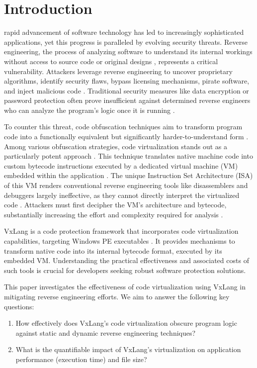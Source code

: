 \section{Introduction}
 rapid advancement of software technology has led to increasingly sophisticated applications, yet this progress is paralleled by evolving security threats. Reverse engineering, the process of analyzing software to understand its internal workings without access to source code or original designs \cite{Has18}, represents a critical vulnerability. Attackers leverage reverse engineering to uncover proprietary algorithms, identify security flaws, bypass licensing mechanisms, pirate software, and inject malicious code \cite{Wak24}. Traditional security measures like data encryption or password protection often prove insufficient against determined reverse engineers who can analyze the program's logic once it is running \cite{Sec19}.

To counter this threat, code obfuscation techniques aim to transform program code into a functionally equivalent but significantly harder-to-understand form \cite{Jin24}. Among various obfuscation strategies, code virtualization stands out as a particularly potent approach \cite{Ore06, Zho24}. This technique translates native machine code into custom bytecode instructions executed by a dedicated virtual machine (VM) embedded within the application \cite{Don20}. The unique Instruction Set Architecture (ISA) of this VM renders conventional reverse engineering tools like disassemblers and debuggers largely ineffective, as they cannot directly interpret the virtualized code \cite{Salwan2018SymbolicDeobfuscation}. Attackers must first decipher the VM's architecture and bytecode, substantially increasing the effort and complexity required for analysis \cite{Hac24}.

VxLang is a code protection framework that incorporates code virtualization capabilities, targeting Windows PE executables \cite{VxLang}. It provides mechanisms to transform native code into its internal bytecode format, executed by its embedded VM. Understanding the practical effectiveness and associated costs of such tools is crucial for developers seeking robust software protection solutions.

This paper investigates the effectiveness of code virtualization using VxLang in mitigating reverse engineering efforts. We aim to answer the following key questions:
\begin{enumerate}
    \item How effectively does VxLang's code virtualization obscure program logic against static and dynamic reverse engineering techniques?
    \item What is the quantifiable impact of VxLang's virtualization on application performance (execution time) and file size?
\end{enumerate}

